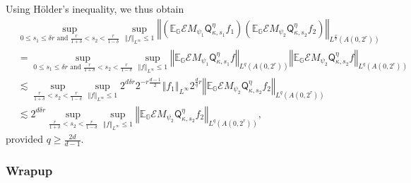 \documentclass{amsart}%
\theoremstyle{plain}
\numberwithin{equation}{section}
\begin{document}
Using H\"{o}lder's inequality, we thus obtain%
\begin{align}
& \sup_{0\leq s_{1}\leq\delta r\text{ and }\frac{r}{1+\delta}<s_{2}<\frac
{r}{1-\delta}}\sup_{\left\Vert f\right\Vert _{L^{\infty}}\leq1}\left\Vert
\left(  \mathbb{E}_{\mathbb{G}}\mathcal{E}M_{\psi_{1}}\mathsf{Q}_{\kappa
,s_{1}}^{\eta}f_{1}\right)  \left(  \mathbb{E}_{\mathbb{G}}\mathcal{E}%
M_{\psi_{2}}\mathsf{Q}_{\kappa,s_{2}}^{\eta}f_{2}\right)  \right\Vert
_{L^{\frac{q}{2}}\left(  A\left(  0,2^{r}\right)  \right)  }\label{third half}%
\\
& =\sup_{0\leq s_{1}\leq\delta r\text{ and }\frac{r}{1+\delta}<s_{2}<\frac
{r}{1-\delta}}\sup_{\left\Vert f\right\Vert _{L^{\infty}}\leq1}\left\Vert
\mathbb{E}_{\mathbb{G}}\mathcal{E}M_{\psi_{1}}\mathsf{Q}_{\kappa,s_{1}}^{\eta
}f\right\Vert _{L^{q}\left(  A\left(  0,2^{r}\right)  \right)  }\left\Vert
\mathbb{E}_{\mathbb{G}}\mathcal{E}M_{\psi_{2}}\mathsf{Q}_{\kappa,s_{2}}^{\eta
}f\right\Vert _{L^{q}\left(  A\left(  0,2^{r}\right)  \right)  }\nonumber\\
& \lesssim\sup_{\frac{r}{1+\delta}<s_{2}<\frac{r}{1-\delta}}\sup_{\left\Vert
f\right\Vert _{L^{\infty}}\leq1}2^{d\delta r}2^{-r\frac{d-1}{2}}\left\Vert
f_{1}\right\Vert _{L^{\infty}}2^{\frac{d}{q}r}\left\Vert \mathbb{E}%
_{\mathbb{G}}\mathcal{E}M_{\psi_{2}}\mathsf{Q}_{\kappa,s_{2}}^{\eta}%
f_{2}\right\Vert _{L^{q}\left(  A\left(  0,2^{r}\right)  \right)  }\nonumber\\
& \lesssim2^{d\delta r}\sup_{\frac{r}{1+\delta}<s_{2}<\frac{r}{1-\delta}}%
\sup_{\left\Vert f\right\Vert _{L^{\infty}}\leq1}\left\Vert \mathbb{E}%
_{\mathbb{G}}\mathcal{E}M_{\psi_{2}}\mathsf{Q}_{\kappa,s_{2}}^{\eta}%
f_{2}\right\Vert _{L^{q}\left(  A\left(  0,2^{r}\right)  \right)  },\nonumber
\end{align}
provided $q\geq\frac{2d}{d-1}$.

\subsubsection{Wrapup}
\end{document}
